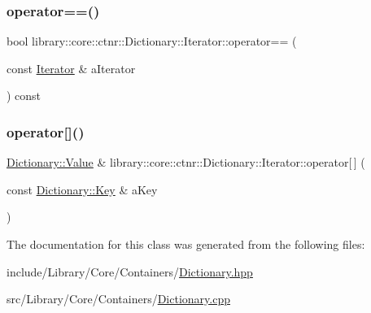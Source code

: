 \mbox{\label{classlibrary_1_1core_1_1ctnr_1_1_dictionary_1_1_iterator_a4901ad2232bec38f673c7442b8460c93}} 
\subsubsection{\texorpdfstring{operator==()}{operator==()}}
{\footnotesize\ttfamily bool library\+::core\+::ctnr\+::\+Dictionary\+::\+Iterator\+::operator== (\begin{DoxyParamCaption}\item[{const \mbox{\hyperlink{classlibrary_1_1core_1_1ctnr_1_1_dictionary_1_1_iterator}{Iterator}} \&}]{a\+Iterator }\end{DoxyParamCaption}) const}

\mbox{\label{classlibrary_1_1core_1_1ctnr_1_1_dictionary_1_1_iterator_a74b081965e71a2169245e43e7a4aff98}} 
\subsubsection{\texorpdfstring{operator[]()}{operator[]()}}
{\footnotesize\ttfamily \mbox{\hyperlink{classlibrary_1_1core_1_1ctnr_1_1_dictionary_a3baf6692694e4fc27cb399ac083c88ea}{Dictionary\+::\+Value}} \& library\+::core\+::ctnr\+::\+Dictionary\+::\+Iterator\+::operator\mbox{[}$\,$\mbox{]} (\begin{DoxyParamCaption}\item[{const \mbox{\hyperlink{classlibrary_1_1core_1_1ctnr_1_1_dictionary_a987cae687cce70d81a2a483c5e05e842}{Dictionary\+::\+Key}} \&}]{a\+Key }\end{DoxyParamCaption})}



The documentation for this class was generated from the following files\+:\begin{DoxyCompactItemize}
\item 
include/\+Library/\+Core/\+Containers/\mbox{\hyperlink{_dictionary_8hpp}{Dictionary.\+hpp}}\item 
src/\+Library/\+Core/\+Containers/\mbox{\hyperlink{_dictionary_8cpp}{Dictionary.\+cpp}}\end{DoxyCompactItemize}
